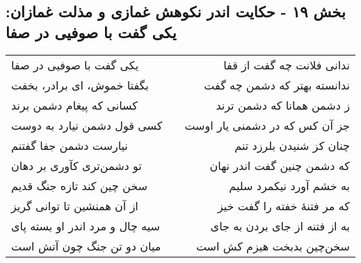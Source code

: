 \begin{center}
\section*{بخش ۱۹ - حکایت اندر نکوهش غمازی و مذلت غمازان: یکی گفت با صوفیی در صفا}
\label{sec:019}
\begin{longtable}{l p{0.5cm} r}
یکی گفت با صوفیی در صفا
&&
ندانی فلانت چه گفت از قفا
\\
بگفتا خموش، ای برادر، بخفت
&&
ندانسته بهتر که دشمن چه گفت
\\
کسانی که پیغام دشمن برند
&&
ز دشمن همانا که دشمن ترند
\\
کسی قول دشمن نیارد به دوست
&&
جز آن کس که در دشمنی یار اوست
\\
نیارست دشمن جفا گفتنم
&&
چنان کز شنیدن بلرزد تنم
\\
تو دشمن‌تری کآوری بر دهان
&&
که دشمن چنین گفت اندر نهان
\\
سخن چین کند تازه جنگ قدیم
&&
به خشم آورد نیکمرد سلیم
\\
از آن همنشین تا توانی گریز
&&
که مر فتنهٔ خفته را گفت خیز
\\
سیه چال و مرد اندر او بسته پای
&&
به از فتنه از جای بردن به جای
\\
میان دو تن جنگ چون آتش است
&&
سخن‌چین بدبخت هیزم کش است
\\
\end{longtable}
\end{center}
